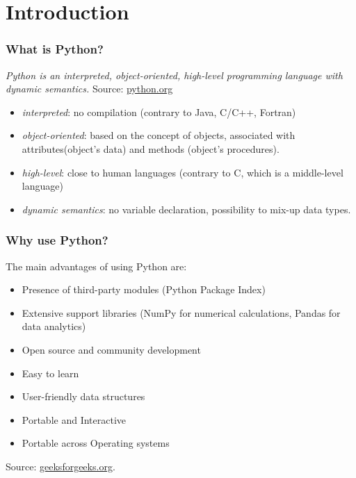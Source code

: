 \section{Introduction}

\begin{frame}[fragile]

\frametitle{What is Python?}

\emph{Python is an interpreted, object-oriented, high-level programming language with dynamic semantics.} Source: \href{https://www.python.org/doc/essays/blurb/}{python.org}

\begin{itemize}
\item \emph{interpreted}: no compilation (contrary to Java, C/C++, Fortran)
\item \emph{object-oriented}: based on the concept of objects, associated with attributes(object's data) and methods (object's procedures).
\item \emph{high-level}: close to human languages (contrary to C, which is a middle-level language)
\item \emph{dynamic semantics}: no variable declaration, possibility to mix-up data types.
\end{itemize}
\end{frame}

\begin{frame}[fragile]
\frametitle{Why use Python?}

The main advantages of using Python are:

\begin{itemize}
\item Presence of third-party modules (Python Package Index)
\item Extensive support libraries (NumPy for numerical calculations, Pandas for data analytics)
\item Open source and community development
\item Easy to learn
\item User-friendly data structures
\item Portable and Interactive
\item Portable across Operating systems
\end{itemize}

Source: \href{https://www.geeksforgeeks.org/python-language-advantages-applications/}{geeksforgeeks.org}.

\end{frame}

